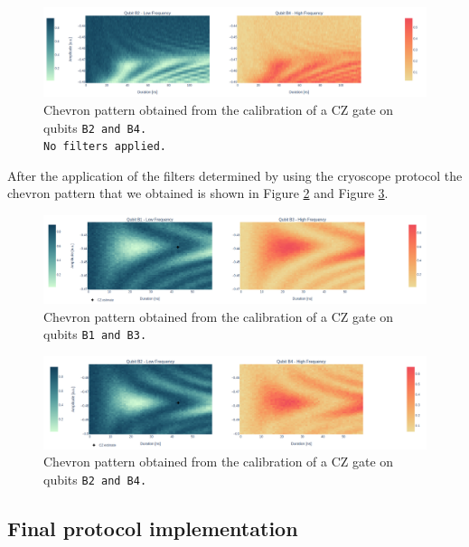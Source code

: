 \begin{figure}[h!]
    \centering
    \includegraphics[width=\textwidth]{figures/png/Cryoscope/B2B4_nofilter.png}
    \caption{Chevron pattern obtained from the calibration of a CZ gate on qubits \tt{B2} and \tt{B4}.\\ No filters applied.}
    \label{fig:B2B4_nofilter}
\end{figure}

After the application of the filters determined by using the cryoscope protocol the chevron pattern that we obtained is shown in Figure \ref{fig:B1B3} and Figure \ref{fig:B2B4}.

\begin{figure}[h!]
    \centering
    \includegraphics[width=\textwidth]{figures/png/Cryoscope/B1B3.png}
    \caption{Chevron pattern obtained from the calibration of a CZ gate on qubits \tt{B1} and \tt{B3}.}
    \label{fig:B1B3}
\end{figure}

\begin{figure}[h!]
    \centering
    \includegraphics[width=\textwidth]{figures/png/Cryoscope/B2B4.png}
    \caption{Chevron pattern obtained from the calibration of a CZ gate on qubits \tt{B2} and \tt{B4}.}
    \label{fig:B2B4}
\end{figure}

\newpage
\restoregeometry

\subsection{Final protocol implementation}

